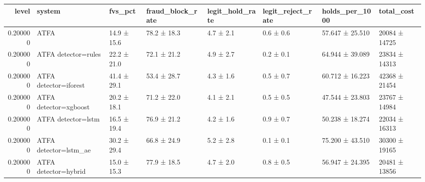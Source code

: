 \begin{tabular}{rlllllll}
\toprule
level & system & fvs\_pct & fraud\_block\_rate & legit\_hold\_rate & legit\_reject\_rate & holds\_per\_1000 & total\_cost \\
\midrule
0.200000 & ATFA & 14.9 ± 15.6 & 78.2 ± 18.3 & 4.7 ± 2.1 & 0.6 ± 0.6 & 57.647 ± 25.510 & 20084 ± 14725 \\
0.200000 & ATFA detector=rules & 22.2 ± 21.0 & 72.1 ± 21.2 & 4.9 ± 2.7 & 0.2 ± 0.1 & 64.944 ± 39.089 & 23834 ± 14313 \\
0.200000 & ATFA detector=iforest & 41.4 ± 29.1 & 53.4 ± 28.7 & 4.3 ± 1.6 & 0.5 ± 0.7 & 60.712 ± 16.223 & 42368 ± 21454 \\
0.200000 & ATFA detector=xgboost & 20.2 ± 18.1 & 71.2 ± 22.0 & 4.1 ± 2.1 & 0.5 ± 0.5 & 47.544 ± 23.803 & 23767 ± 14984 \\
0.200000 & ATFA detector=lstm & 16.5 ± 19.4 & 76.9 ± 21.2 & 4.2 ± 1.6 & 0.9 ± 0.7 & 50.238 ± 18.274 & 22034 ± 16313 \\
0.200000 & ATFA detector=lstm\_ae & 30.2 ± 29.4 & 66.8 ± 24.9 & 5.2 ± 2.8 & 0.1 ± 0.1 & 75.200 ± 43.510 & 30300 ± 19165 \\
0.200000 & ATFA detector=hybrid & 15.0 ± 15.3 & 77.9 ± 18.5 & 4.7 ± 2.0 & 0.8 ± 0.5 & 56.947 ± 24.395 & 20481 ± 13856 \\
\bottomrule
\end{tabular}
